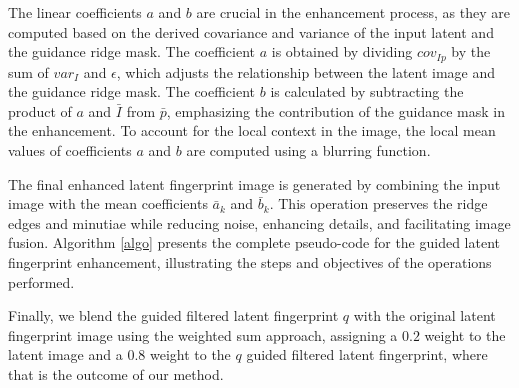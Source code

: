 \documentclass[twocolumn, switch]{article} %
\begin{document}
The linear coefficients $a$ and $b$ are crucial in the enhancement process, as they are computed based on the derived covariance and variance of the input latent and the guidance ridge mask. The coefficient $a$ is obtained by dividing $cov_{Ip}$ by the sum of $var_I$ and $\epsilon$, which adjusts the relationship between the latent image and the guidance ridge mask. The coefficient $b$ is calculated by subtracting the product of $a$ and $\bar{I}$ from $\bar{p}$, emphasizing the contribution of the guidance mask in the enhancement. To account for the local context in the image, the local mean values of coefficients $a$ and $b$ are computed using a blurring function.

The final enhanced latent fingerprint image is generated by combining the input image with the mean coefficients $\bar{a}_k$ and $\bar{b}_k$. This operation preserves the ridge edges and minutiae while reducing noise, enhancing details, and facilitating image fusion. Algorithm \ref{algo} presents the complete pseudo-code for the guided latent fingerprint enhancement, illustrating the steps and objectives of the operations performed.

Finally, we blend the guided filtered latent fingerprint $q$ with the original latent fingerprint image using the weighted sum approach, assigning a $0.2$ weight to the latent image and a $0.8$ weight to the $q$ guided filtered latent fingerprint, where that is the outcome of our method. 
\end{document}
